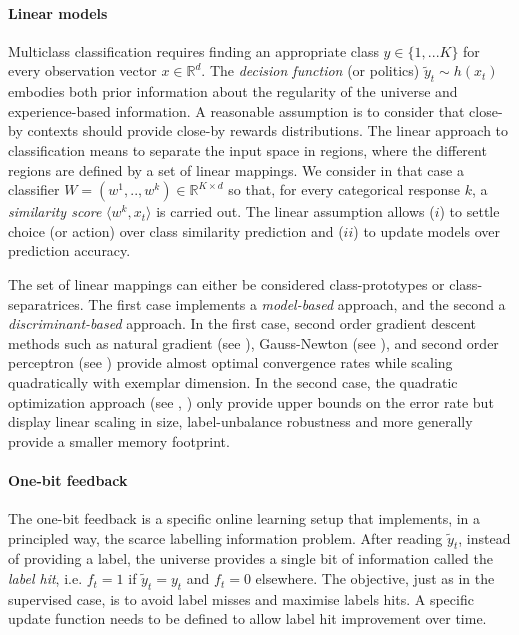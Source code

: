 \documentclass[preprint,12pt,authoryear]{elsarticle}
\begin{document}
\paragraph{Linear models}
Multiclass classification requires  finding an appropriate class $y \in \{1,... K\}$ for every observation vector $x \in \mathbb{R}^d$.
The \textit{decision function} (or politics) $\tilde{y}_t \sim h(x_t)$ embodies both prior information about the regularity of the universe and experience-based information. A reasonable assumption  is to consider that  close-by contexts should provide close-by rewards distributions. 
The linear approach to classification means to separate the input space in regions, where the different regions are defined by a set of linear mappings. We consider in that case a  classifier $W = (w^1,..,w^k) \in \mathbb{R}^{K \times d}$ so that, for every categorical response $k$, a \emph{similarity score} $\langle w^k, x_t\rangle$ is carried out. 
The linear assumption allows ($i$) to 
settle choice (or action) over class similarity prediction and ($ii$) to update models over prediction accuracy.

The set of linear mappings can either be considered class-prototypes or class-separatrices. The first case implements a \textit{model-based} approach, and the second a \textit{discriminant-based} approach. In the first case,  second order gradient descent methods such as natural gradient (see \cite{amari2000adaptive}), Gauss-Newton (see \cite{le2004large}), and second order perceptron (see \cite{cesa2005second}) provide almost optimal convergence rates while scaling quadratically with exemplar dimension.
In the second case, the quadratic optimization approach (see \cite{anlauf1989adatron}, \cite{crammer2006online}) only provide upper bounds on the error rate but display linear scaling in size, label-unbalance robustness and more generally provide a smaller memory footprint. 


\paragraph{One-bit feedback}
The one-bit feedback is a specific online learning setup that implements, in a principled way, the scarce labelling information problem. After reading $\tilde{y}_t$, instead of providing a label, the universe provides a single bit of information called the \textit{label hit}, i.e. $f_t = 1$ if  $\tilde{y}_t=y_t$ and $f_t = 0$ elsewhere. The objective, just as in the supervised case, is to avoid label misses and maximise labels hits. A specific update function needs to be defined to allow label hit improvement over time. 
\end{document}
